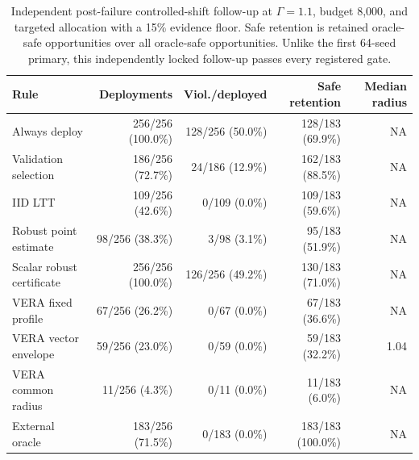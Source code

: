 \begin{table}[t]
\centering
\small
\begin{tabular}{@{}lrrrr@{}}
\toprule
Rule & Deployments & Viol./deployed & Safe retention & Median radius \\
\midrule
Always deploy & 256/256 (100.0\%) & 128/256 (50.0\%) & 128/183 (69.9\%) & NA \\
Validation selection & 186/256 (72.7\%) & 24/186 (12.9\%) & 162/183 (88.5\%) & NA \\
IID LTT & 109/256 (42.6\%) & 0/109 (0.0\%) & 109/183 (59.6\%) & NA \\
Robust point estimate & 98/256 (38.3\%) & 3/98 (3.1\%) & 95/183 (51.9\%) & NA \\
Scalar robust certificate & 256/256 (100.0\%) & 126/256 (49.2\%) & 130/183 (71.0\%) & NA \\
VERA fixed profile & 67/256 (26.2\%) & 0/67 (0.0\%) & 67/183 (36.6\%) & NA \\
VERA vector envelope & 59/256 (23.0\%) & 0/59 (0.0\%) & 59/183 (32.2\%) & 1.04 \\
VERA common radius & 11/256 (4.3\%) & 0/11 (0.0\%) & 11/183 (6.0\%) & NA \\
External oracle & 183/256 (71.5\%) & 0/183 (0.0\%) & 183/183 (100.0\%) & NA \\
\bottomrule
\end{tabular}
\caption{Independent post-failure controlled-shift follow-up at $\Gamma=1.1$, budget 8,000, and targeted allocation with a 15\% evidence floor. Safe retention is retained oracle-safe opportunities over all oracle-safe opportunities. Unlike the first 64-seed primary, this independently locked follow-up passes every registered gate.}
\label{tab:controlled-followup}
\end{table}
